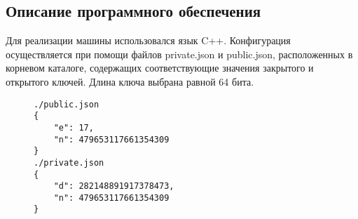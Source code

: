 
\subsection{Описание программного обеспечения}

Для реализации машины использовался язык C++. Конфигурация осуществляется
при помощи файлов private.json и public.json, расположенных в корневом каталоге,
содержащих соответствующие значения закрытого и открытого ключей.
Длина ключа выбрана равной 64 бита.

\begin{figure}[!h]
    \begin{verbatim}
./public.json
{
    "e": 17,
    "n": 479653117661354309
}
./private.json
{
    "d": 282148891917378473,
    "n": 479653117661354309
}
    \end{verbatim}
\end{figure}

